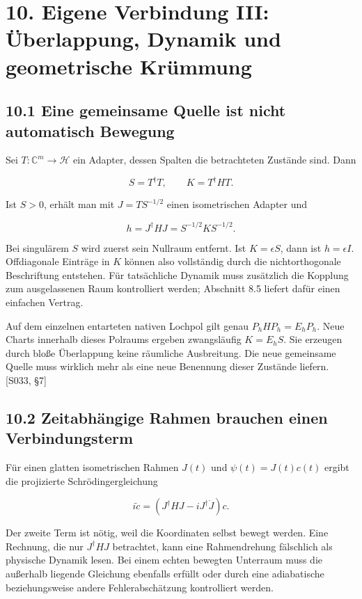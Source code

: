\section{10. Eigene Verbindung III: Überlappung, Dynamik und
geometrische
Krümmung}\label{eigene-verbindung-iii-uxfcberlappung-dynamik-und-geometrische-kruxfcmmung}

\subsection{10.1 Eine gemeinsame Quelle ist nicht automatisch
Bewegung}\label{eine-gemeinsame-quelle-ist-nicht-automatisch-bewegung}

Sei \(T:\mathbb C^m\to\mathcal H\) ein Adapter, dessen Spalten die
betrachteten Zustände sind. Dann

\[S=T^\dagger T,\qquad K=T^\dagger HT.\]

Ist \(S>0\), erhält man mit \(J=TS^{-1/2}\) einen isometrischen Adapter
und

\[h=J^\dagger HJ=S^{-1/2}KS^{-1/2}.\]

Bei singulärem \(S\) wird zuerst sein Nullraum entfernt. Ist
\(K=\epsilon S\), dann ist \(h=\epsilon I\). Offdiagonale Einträge in
\(K\) können also vollständig durch die nichtorthogonale Beschriftung
entstehen. Für tatsächliche Dynamik muss zusätzlich die Kopplung zum
ausgelassenen Raum kontrolliert werden; Abschnitt 8.5 liefert dafür
einen einfachen Vertrag.

Auf dem einzelnen entarteten nativen Lochpol gilt genau
\(P_hHP_h=E_hP_h\). Neue Charts innerhalb dieses Polraums ergeben
zwangsläufig \(K=E_hS\). Sie erzeugen durch bloße Überlappung keine
räumliche Ausbreitung. Die neue gemeinsame Quelle muss wirklich mehr als
eine neue Benennung dieser Zustände liefern. {[}S033, §7{]}

\subsection{10.2 Zeitabhängige Rahmen brauchen einen
Verbindungsterm}\label{zeitabhuxe4ngige-rahmen-brauchen-einen-verbindungsterm}

Für einen glatten isometrischen Rahmen \(J(t)\) und \(\psi(t)=J(t)c(t)\)
ergibt die projizierte Schrödingergleichung

\[\boxed{i\dot c=(J^\dagger HJ-iJ^\dagger\dot J)c.}\]

Der zweite Term ist nötig, weil die Koordinaten selbst bewegt werden.
Eine Rechnung, die nur \(J^\dagger HJ\) betrachtet, kann eine
Rahmendrehung fälschlich als physische Dynamik lesen. Bei einem echten
bewegten Unterraum muss die außerhalb liegende Gleichung ebenfalls
erfüllt oder durch eine adiabatische beziehungsweise andere
Fehlerabschätzung kontrolliert werden.

